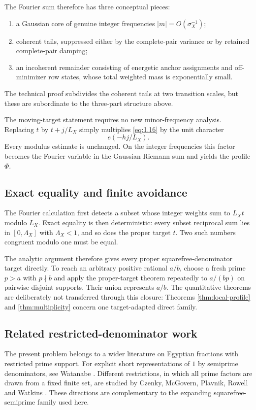 The Fourier sum therefore has three conceptual pieces:
\begin{enumerate}[label=\textup{(\roman*)}]
\item a Gaussian core of genuine integer frequencies $|m|=O(\sigma_X^{-1})$;
\item coherent tails, suppressed either by the complete-pair variance or by retained complete-pair damping;
\item an incoherent remainder consisting of energetic anchor assignments and off-minimizer row states, whose total weighted mass is exponentially small.
\end{enumerate}
The technical proof subdivides the coherent tails at two transition scales, but these are subordinate to the three-part structure above.

The moving-target statement requires no new minor-frequency analysis. Replacing $t$ by $t+j/L_X$ simply multiplies \eqref{eq:1.16} by the unit character
\[
e(-hj/L_X).
\]
Every modulus estimate is unchanged. On the integer frequencies this factor becomes the Fourier variable in the Gaussian Riemann sum and yields the profile $\Phi$.

\subsection{Exact equality and finite avoidance}

The Fourier calculation first detects a subset whose integer weights sum to $L_Xt$ modulo $L_X$. Exact equality is then deterministic: every subset reciprocal sum lies in $[0,\Lambda_X]$ with $\Lambda_X<1$, and so does the proper target $t$. Two such numbers congruent modulo one must be equal.

The analytic argument therefore gives every proper squarefree-denominator target directly. To reach an arbitrary positive rational $a/b$, choose a fresh prime $p>a$ with $p\nmid b$ and apply the proper-target theorem repeatedly to $a/(bp)$ on pairwise disjoint supports. Their union represents $a/b$. The quantitative theorems are deliberately not transferred through this closure: Theorems \ref{thm:local-profile} and \ref{thm:multiplicity} concern one target-adapted direct family.

\subsection{Related restricted-denominator work}

The present problem belongs to a wider literature on Egyptian fractions with restricted prime support. For explicit short representations of $1$ by semiprime denominators, see Watanabe \cite{Watanabe2020}. Different restrictions, in which all prime factors are drawn from a fixed finite set, are studied by Czenky, McGovern, Plavnik, Rowell and Watkins \cite{CzenkyEtAl2025}. These directions are complementary to the expanding squarefree-semiprime family used here.


